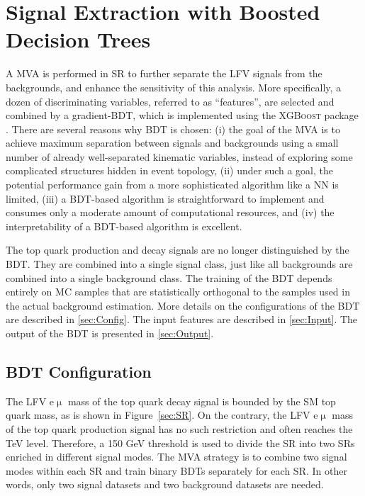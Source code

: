 \chapter{Signal Extraction with Boosted Decision Trees}
\label{chap:BDT}

A \ac{MVA} is performed in \ac{SR} to further separate the LFV signals from the backgrounds, and enhance the sensitivity of this analysis. More specifically, a dozen of discriminating variables, referred to as ``features'', are selected and combined by a gradient-\ac{BDT}, which is implemented using the \textsc{XGBoost} package \cite{Chen:2016:XST:2939672.2939785}. There are several reasons why \ac{BDT} is chosen: (i) the goal of the \ac{MVA} is to achieve maximum separation between signals and backgrounds using a small number of already well-separated kinematic variables, instead of exploring some complicated structures hidden in event topology, (ii) under such a goal, the potential performance gain from a more sophisticated algorithm like a \ac{NN} is limited, (iii) a \ac{BDT}-based algorithm is straightforward to implement and consumes only a moderate amount of computational resources, and (iv) the interpretability of a \ac{BDT}-based algorithm is excellent. 

The top quark production and decay signals are no longer distinguished by the \ac{BDT}. They are combined into a single signal class, just like all backgrounds are combined into a single background class. The training of the \ac{BDT} depends entirely on \ac{MC} samples that are statistically orthogonal to the samples used in the actual background estimation. More details on the configurations of the \ac{BDT} are described in \autoref{sec:Config}. The input features are described in \autoref{sec:Input}. The output of the \ac{BDT} is presented in \autoref{sec:Output}.

\section{BDT Configuration}
\label{sec:Config}

The LFV e$\upmu$ mass of the top quark decay signal is bounded by the \ac{SM} top quark mass, as is shown in Figure~\ref{sec:SR}. On the contrary, the LFV e$\upmu$ mass of the top quark production signal has no such restriction and often reaches the TeV level. Therefore, a 150 GeV threshold is used to divide the \ac{SR} into two \acp{SR} enriched in different signal modes. The \ac{MVA} strategy is to combine two signal modes within each \ac{SR} and train binary \acp{BDT} separately for each \ac{SR}. In other words, only two signal datasets and two background datasets are needed.
  
